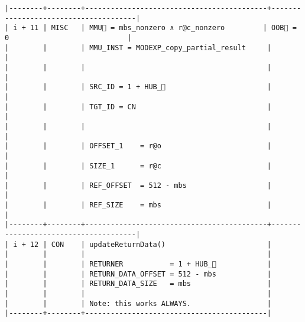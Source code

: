 \documentclass[varwidth=\maxdimen,margin=0.5cm,multi={verbatim}]{standalone}
\begin{document}
\begin{verbatim}
|--------+--------+-------------------------------------------+--------------------------------------|
| i + 11 | MISC   | MMU🏴 = mbs_nonzero ∧ r@c_nonzero         | OOB🏴 = 0                            |
|        |        | MMU_INST = MODEXP_copy_partial_result     |                                      |
|        |        |                                           |                                      |
|        |        | SRC_ID = 1 + HUB_                        |                                      |
|        |        | TGT_ID = CN                               |                                      |
|        |        |                                           |                                      |
|        |        | OFFSET_1    = r@o                         |                                      |
|        |        | SIZE_1      = r@c                         |                                      |
|        |        | REF_OFFSET  = 512 - mbs                   |                                      |
|        |        | REF_SIZE    = mbs                         |                                      |
|--------+--------+-------------------------------------------+--------------------------------------|
| i + 12 | CON    | updateReturnData()                        |
|        |        |                                           |
|        |        | RETURNER           = 1 + HUB_            |
|        |        | RETURN_DATA_OFFSET = 512 - mbs            |
|        |        | RETURN_DATA_SIZE   = mbs                  |
|        |        |                                           |
|        |        | Note: this works ALWAYS.                  |
|--------+--------+-------------------------------------------|
\end{verbatim}
\end{document}
